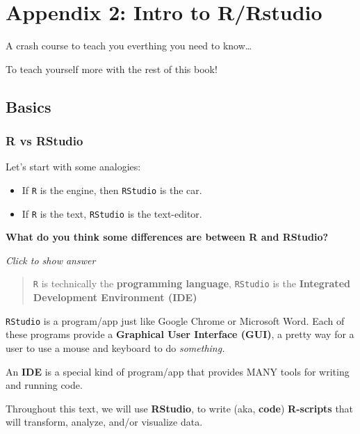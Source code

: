 \documentclass[
]{book}
\begin{document}
\hypertarget{appendix-2-intro-to-rrstudio}{%
\chapter*{Appendix 2: Intro to R/Rstudio}\label{appendix-2-intro-to-rrstudio}}

A crash course to teach you everthing you need to know\ldots{}

To teach yourself more with the rest of this book!

\hypertarget{basics}{%
\section*{Basics}\label{basics}}

\hypertarget{r-vs-rstudio}{%
\subsection*{R vs RStudio}\label{r-vs-rstudio}}

Let's start with some analogies:

\begin{itemize}
\item
  If \texttt{R} is the engine, then \texttt{RStudio} is the car.
\item
  If \texttt{R} is the text, \texttt{RStudio} is the text-editor.
\end{itemize}

\textbf{What do you think some differences are between R and RStudio?}

\emph{Click to show answer}

\begin{quote}
\texttt{R} is technically the \textbf{programming language},
\texttt{RStudio} is the \textbf{Integrated Development Environment (IDE)}
\end{quote}

\texttt{RStudio} is a program/app just like Google Chrome or Microsoft Word. Each
of these programs provide a \textbf{Graphical User Interface (GUI)}, a pretty way for
a user to use a mouse and keyboard to do \emph{something.}

An \textbf{IDE} is a special kind of program/app that provides MANY tools for writing and running code.

Throughout this text, we will use \textbf{RStudio}, to write (aka, \textbf{code}) \textbf{R-scripts} that will transform, analyze, and/or visualize data.
\end{document}
